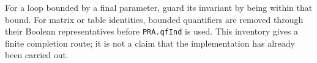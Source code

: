For a loop bounded by a final parameter, guard its invariant by being within
that bound. For matrix or table identities, bounded quantifiers are removed
through their Boolean representatives before \texttt{PRA.qfInd} is used.
This inventory gives a finite completion route; it is not a claim that the
implementation has already been carried out.
